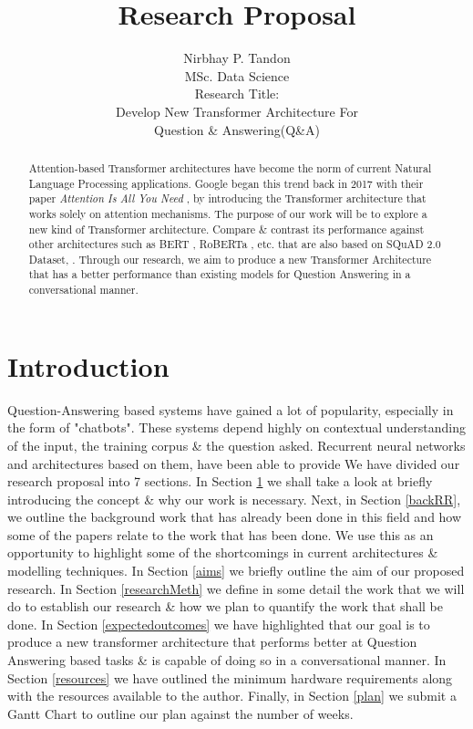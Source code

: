 \documentclass[11pt]{article}
\begin{document}
\title{Research Proposal}

\author{Nirbhay P. Tandon\\MSc. Data Science\\
    Research Title:\\Develop New Transformer Architecture For \\ Question \& Answering(Q\&A)
}
\date{}
\maketitle

\newpage
\begin{abstract}
Attention-based Transformer architectures have become the norm of current Natural Language Processing applications. Google began this trend back in 2017 with their paper \textit{Attention Is All You Need} \citep{atayl}, by introducing the Transformer architecture that works solely on attention mechanisms. The purpose of our work will be to explore a new kind of Transformer architecture. Compare \& contrast its performance against other architectures such as BERT \citep{bert}, RoBERTa \citep{roberta}, etc. that are also based on SQuAD 2.0 Dataset, \citep{dataset}. Through our research, we aim to produce a new Transformer Architecture that has a better performance than existing models for Question Answering in a conversational manner.
\end{abstract}
\newpage
\tableofcontents
\newpage
\section{Introduction}\label{introduction}

Question-Answering based systems have gained a lot of popularity, especially in the form of "chatbots". These systems depend highly on contextual understanding of the input, the training corpus \& the question asked. Recurrent neural networks and architectures based on them, have been able to provide
We have divided our research proposal into 7 sections.
In Section \ref{introduction} we shall take a look at briefly introducing the concept \& why our work is necessary. Next, in Section \ref{backRR}, we outline the background work that has already been done in this field and how some of the papers relate to the work that has been done. We use this as an opportunity to highlight some of the shortcomings in current architectures \& modelling techniques. In Section \ref{aims} we briefly outline the aim of our proposed research. In Section \ref{researchMeth} we define in some detail the work that we will do to establish our research \& how we plan to quantify the work that shall be done. In Section \ref{expectedoutcomes} we have highlighted that our goal is to produce a new transformer architecture that performs better at Question Answering based tasks \& is capable of doing so in a conversational manner.
In Section \ref{resources} we have outlined the minimum hardware requirements along with the resources available to the author. Finally, in Section \ref{plan} we submit a Gantt Chart to outline our plan against the number of weeks.
\end{document}
